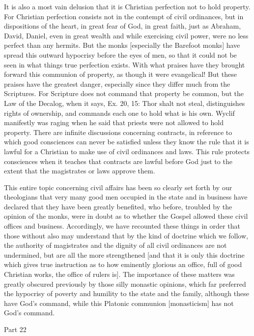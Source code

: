 It is also a most vain delusion that it is Christian perfection not
to hold property.  For Christian perfection consists not in the
contempt of civil ordinances, but in dispositions of the heart, in
great fear of God, in great faith, just as Abraham, David, Daniel,
even in great wealth and while exercising civil power, were no less
perfect than any hermits.  But the monks [especially the Barefoot
monks] have spread this outward hypocrisy before the eyes of men, so
that it could not be seen in what things true perfection exists.
With what praises have they brought forward this communion of
property, as though it were evangelical!  But these praises have the
greatest danger, especially since they differ much from the
Scriptures.  For Scripture does not command that property be common,
but the Law of the Decalog, when it says, Ex. 20, 15: Thor shalt not
steal, distinguishes rights of ownership, and commands each one to
hold what is his own.  Wyclif manifestly was raging when he said that
priests were not allowed to hold property.  There are infinite
discussions concerning contracts, in reference to which good
consciences can never be satisfied unless they know the rule that it
is lawful for a Christian to make use of civil ordinances and laws.
This rule protects consciences when it teaches that contracts are
lawful before God just to the extent that the magistrates or laws
approve them.

This entire topic concerning civil affairs has been so clearly set
forth by our theologians that very many good men occupied in the
state and in business have declared that they have been greatly
benefited, who before, troubled by the opinion of the monks, were in
doubt as to whether the Gospel allowed these civil offices and
business.  Accordingly, we have recounted these things in order that
those without also may understand that by the kind of doctrine which
we follow, the authority of magistrates and the dignity of all civil
ordinances are not undermined, but are all the more strengthened [and
that it is only this doctrine which gives true instruction as to how
eminently glorious an office, full of good Christian works, the
office of rulers is].  The importance of these matters was greatly
obscured previously by those silly monastic opinions, which far
preferred the hypocrisy of poverty and humility to the state and the
family, although these have God's command, while this Platonic
communion [monasticism] has not God's command.




Part 22


